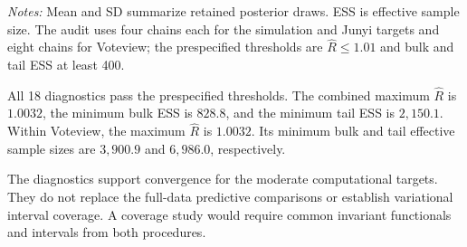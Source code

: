 \documentclass[
  12pt]{article}
\newcommand{\TableNote}[1]{%
  \par\vspace{0.35em}\noindent
  \begin{minipage}{0.96\linewidth}
    \footnotesize\setstretch{1.05}\raggedright
    \textit{Notes:} #1
  \end{minipage}%
  \par\vspace{0.6\baselineskip}%
}
\theoremstyle{definition}
\theoremstyle{plain}
\begin{document}
\TableNote{Mean and SD summarize retained posterior draws. ESS is effective sample size. The audit uses four chains each for the simulation and Junyi targets and eight chains for Voteview; the prespecified thresholds are $\widehat R\le1.01$ and bulk and tail ESS at least 400.}
\endgroup

All 18 diagnostics pass the prespecified thresholds.
The combined maximum $\widehat R$ is $1.0032$, the minimum bulk ESS is $828.8$, and the minimum tail ESS is $2,150.1$.
Within Voteview, the maximum $\widehat R$ is $1.0032$.
Its minimum bulk and tail effective sample sizes are $3,900.9$ and $6,986.0$, respectively.

The diagnostics support convergence for the moderate computational targets. They do not replace the full-data predictive comparisons or establish variational interval coverage. A coverage study would require common invariant functionals and intervals from both procedures.



\end{document}
